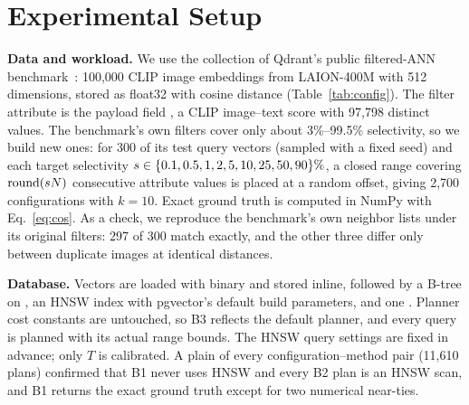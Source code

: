 \section{Experimental Setup}
\label{sec:setup}

\textbf{Data and workload.} We use the  collection of Qdrant's public filtered-ANN
benchmark~\cite{qdrant-datasets}: 100{,}000 CLIP image embeddings from LAION-400M with 512 dimensions, stored as
float32 with cosine distance (Table~\ref{tab:config}). The filter attribute is the payload field , a
CLIP image--text score with 97{,}798 distinct values. The benchmark's own filters cover only about 3\%--99.5\%
selectivity, so we build new ones: for 300 of its test query vectors (sampled with a fixed seed) and each target
selectivity $s\in\{0.1,0.5,1,2,5,10,25,50,90\}\%$, a closed range covering $\mathrm{round}(s N)$ consecutive
attribute values is placed at a random offset, giving 2{,}700 configurations with $k=10$. Exact ground truth is
computed in NumPy with Eq.~\eqref{eq:cos}. As a check, we reproduce the benchmark's own neighbor lists under its
original filters: 297 of 300 match exactly, and the other three differ only between duplicate images at identical
distances.

\textbf{Database.} Vectors are loaded with binary  and stored inline, followed by a B-tree on
, an HNSW index with pgvector's default build parameters, and one . Planner cost
constants are untouched, so B3 reflects the default planner, and every query is planned with its actual range
bounds. The HNSW query settings are fixed in advance; only $T$ is calibrated. A plain  of every
configuration--method pair (11{,}610 plans) confirmed that B1 never uses HNSW and every B2 plan is an HNSW scan, and B1
returns the exact ground truth except for two numerical near-ties.

